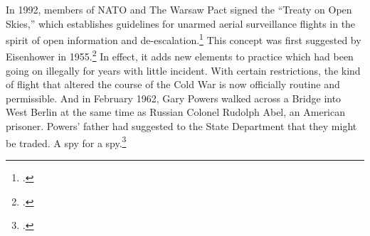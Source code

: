 \documentclass[12pt]{article}
\begin{document}
In 1992, members of NATO and The Warsaw Pact signed the ``Treaty on Open Skies,'' which establishes guidelines for unarmed aerial surveillance flights in the spirit of open information and de-escalation.\footcite{organization_for_security_and_co-operation_in_europe_treaty_1992} This concept was first suggested by Eisenhower in 1955.\footcite{center_for_arms_control_and_non-proliferation_fact_2017} In effect, it adds new elements to practice which had been going on illegally for years with little incident. With certain restrictions, the kind of flight that altered the course of the Cold War is now officially routine and permissible. And in February 1962, Gary Powers walked across a Bridge into West Berlin at the same time as Russian Colonel Rudolph Abel, an American prisoner. Powers' father had suggested to the State Department that they might be traded. A spy for a spy.\footcite[p.~239]{powers_operation_2004}













\newpage
\printbibliography
\end{document}
